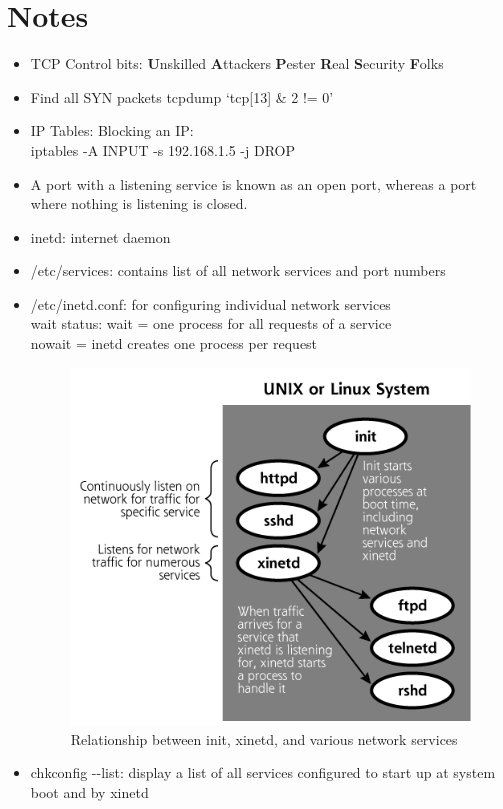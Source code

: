 \documentclass[11pt,twoside,a4paper, titlepage]{article}
\begin{document}
\section{Notes}
\begin{itemize}
  \item  TCP Control bits: \textbf{U}nskilled \textbf{A}ttackers \textbf{P}ester \textbf{R}eal \textbf{S}ecurity \textbf{F}olks
  \item  Find all SYN packets tcpdump `tcp[13] \& 2 != 0'
  \item  IP Tables: Blocking an IP: \\
    \hspace*{1cm}iptables -A INPUT -s 192.168.1.5 -j DROP 
  \item  A port with a listening service is known as an open port, whereas a port where nothing is listening is closed.
  \item  inetd: internet daemon
  \item  /etc/services: contains list of all network services and port numbers
  \item /etc/inetd.conf: for configuring individual network services\\
    \hspace*{1cm}wait status: wait = one process for all requests of a service \\
    \hspace*{3cm} nowait = inetd creates one process per request
    \begin{figure}[!hbp]
      \includegraphics[scale=0.5]{images/services.png}
      \caption{Relationship between init, xinetd, and various network services \label{fig_services}}
    \end{figure}
  \item chkconfig -{}-list: display a list of all services configured to start up at system boot and by xinetd
\end{itemize}
\end{document}
